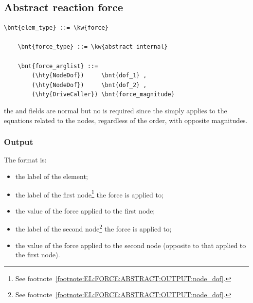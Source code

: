 \subsection{Abstract reaction force}
\begin{Verbatim}[commandchars=\\\{\}]
    \bnt{elem_type} ::= \kw{force}

    \bnt{force_type} ::= \kw{abstract internal}

    \bnt{force_arglist} ::=
        (\hty{NodeDof})     \bnt{dof_1} ,
        (\hty{NodeDof})     \bnt{dof_2} ,
        (\hty{DriveCaller}) \bnt{force_magnitude}
\end{Verbatim}
the  and  fields are normal 
but no  is required since the  simply applies
to the equations related to the nodes, regardless of the order, with
opposite magnitudes.

\subsubsection{Output}
The format is:
\begin{itemize}
    \item the label of the element;
    \item the label of the first node\footnote{See
	footnote~\ref{footnote:EL:FORCE:ABSTRACT:OUTPUT:node_dof}.}
	the force is applied to;
    \item the value of the force applied to the first node;
    \item the label of the second node\footnote{See
	footnote~\ref{footnote:EL:FORCE:ABSTRACT:OUTPUT:node_dof}.}
	the force is applied to;
    \item the value of the force applied to the second node
	  (opposite to that applied to the first node).
\end{itemize}

